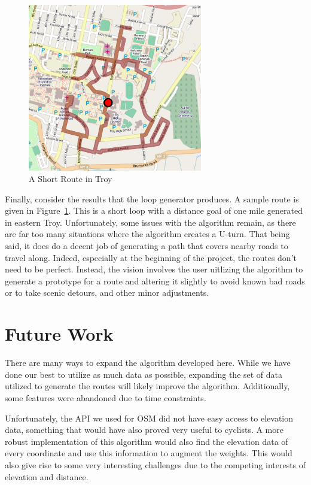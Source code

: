 \documentclass[twocolumn,12pt]{article}
\begin{document}
\begin{figure}
  \includegraphics[width=3in]{images/route.png}
  \caption{A Short Route in Troy} \label{img:route}
\end{figure}

Finally, consider the results that the loop generator produces. A sample route
is given in Figure~\ref{img:route}. This is a short loop with a distance goal of
one mile generated in eastern Troy. Unfortunately, some issues with the
algorithm remain, as there are far too many situations where the algorithm
creates a U-turn. That being said, it does do a decent job of generating a path
that covers nearby roads to travel along. Indeed, especially at the beginning of
the project, the routes don't need to be perfect. Instead, the vision involves
the user uitlizing the algorithm to generate a prototype for a route and
altering it slightly to avoid known bad roads or to take scenic detours, and
other minor adjustments.


\section{Future Work}

There are many ways to expand the algorithm developed here. While we have done
our best to utilize as much data as possible, expanding the set of data utilized
to generate the routes will likely improve the algorithm. Additionally, some
features were abandoned due to time constraints.

Unfortunately, the API we used for OSM did not have easy access to elevation
data, something that would have also proved very useful to cyclists. A more
robust implementation of this algorithm would also find the elevation data of
every coordinate and use this information to augment the weights. This would
also give rise to some very interesting challenges due to the competing
interests of elevation and distance.
\end{document}
